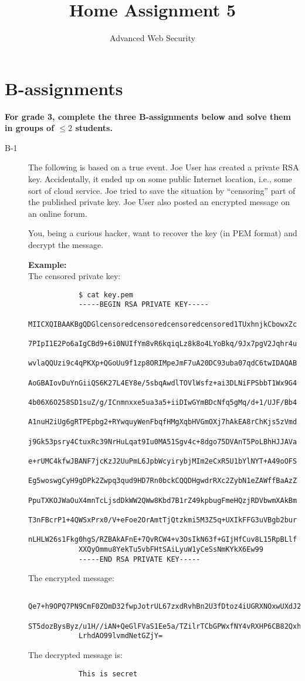 \documentclass{article}
\begin{document}
	
	\title{Home Assignment 5}
	\author{Advanced Web Security}
	\date{\the\year}
	
	\maketitle
	
	\section*{B-assignments}
	\textbf{For grade 3, complete the three B-assignments below and solve them in groups of $\leq 2$ students.}
	
	\begin{description}
		
		\item[B-1]{The following is based on a true event. Joe User has created a private RSA key. Accidentally, it ended up on some public Internet location, i.e., some sort of cloud service. Joe tried to save the situation by ``censoring'' part of the published private key.
			Joe User also posted an encrypted message on an online forum.
			
			You, being a curious hacker, want to recover the key (in PEM format) and decrypt the message.
			
			\textbf{Example:}\\
			The censored private key:
			\begin{verbatim}
			$ cat key.pem
			-----BEGIN RSA PRIVATE KEY-----
			MIICXQIBAAKBgQDGlcensoredcensoredcensoredcensored1TUxhnjkCbowxZc
			7PIpI1E2Po6aIgCBd9+6i0NUIfYm8vR6kqiqLz8k8o4LYoBkq/9Jx7pgV2Jqhr4u
			wvlaQQUzi9c4qPKXp+QGoUu9f1zp8ORIMpeJmF7uA20DC93uba07qdC6twIDAQAB
			AoGBAIovDuYnGiiQS6K27L4EY8e/5sbqAwdlTOVlWsfz+ai3DLNiFPSbbT1Wx9G4
			4b06X6O258SD1suZ/g/ICnmnxxe5ua3a5+iiDIwGYmBDcNfq5gMq/d+1/UJF/Bb4
			A1nuH2iUg6gRTPEpbg2+RYwquyWenFbqfHMgXqbHVGmOXj7hAkEA8rChKjs5zVmd
			j9Gk53psry4CtuxRc39NrHuLqat9Iu0MA51Sgv4c+8dgo75DVAnT5PoLBhHJJAVa
			e+rUMC4kfwJBANF7jcKzJ2UuPmL6JpbWcyirybjMIm2eCxR5U1bYlNYT+A49oOFS
			Eg5woswgCyH9gDPk2Zwpq3qud9HD7Rn0bckCQQDHgwdrRXc2ZybN1eZAWffBaAzZ
			PpuTXKOJWaOuX4mnTcLjsdDkWW2QWw8Kbd7B1rZ49kpbugFmeHQzjRDVbwmXAkBm
			T3nFBcrP1+4QWSxPrx0/V+eFoe2OrAmtTjQtzkmi5M3Z5q+UXIkFFG3uVBgb2bur
			nLHLW26s1Fkg0hgS/RZBAkAFnE+7QvRCW4+v3OsIkN63f+GIjHfCuv8L15RpBLlf
			XXQyOmmu8YekTu5vbFHtSAiLyuW1yCeSsNmKYkX6Ew99
			-----END RSA PRIVATE KEY-----
			\end{verbatim}	
			The encrypted message:
			\begin{verbatim}
			Qe7+h9OPQ7PN9CmF0ZOmD32fwpJotrUL67zxdRvhBn2U3fDtoz4iUGRXNOxwUXdJ2Cmz7zjS0DE8
			ST5dozBysByz/u1H//iAN+QeGlFVaS1Ee5a/TZilrTCbGPWxfNY4vRXHP6CB82QxhMjQ7/x90/+J
			LrhdAO99lvmdNetGZjY=
			\end{verbatim}
			The decrypted message is:
			\begin{verbatim}
			This is secret
			\end{verbatim}

}
\end{description}
\end{document}
